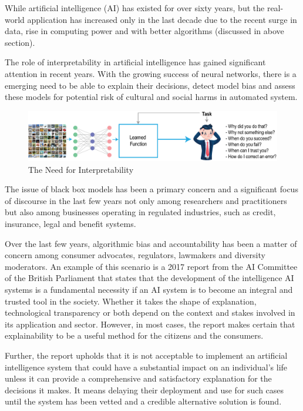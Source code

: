 While artificial intelligence (AI) has existed for over sixty years, but the real-world application has increased only in the last decade due to the recent surge in data, rise in computing power and with better algorithms (discussed in above section).

The role of interpretability in artificial intelligence has gained significant attention in recent years. With the growing success of neural networks, there is a emerging need to be able to explain their decisions, detect model bias and assess these models for potential risk of cultural and social harms in automated system.

\begin{figure}[htbp]
\centering
\includegraphics[width=1\textwidth]{images/xa-concept-part-1.eps}
\caption{The Need for Interpretability}
\label{fig:Why Interpretability Matters}
\end{figure}

The issue of black box models has been a primary concern and a significant focus of discourse in the last few years not only among researchers and practitioners \cite{Samek} but also among businesses operating in regulated industries, such as credit, insurance, legal and benefit systems. 

Over the last few years, algorithmic bias and accountability has been a matter of concern among consumer advocates, regulators, lawmakers and diversity moderators. An example of this scenario is a 2017 report from the AI Committee of the British Parliament \cite{Hagras2018} that states that the development of the intelligence AI systems is a fundamental necessity if an AI system is to become an integral and trusted tool in the society. Whether it takes the shape of explanation, technological transparency or both depend on the context and stakes involved in its application and sector. However, in most cases, the report makes certain that explainability to be a useful method for the citizens and the consumers. 

Further, the report upholds that it is not acceptable to implement an artificial intelligence system that could have a substantial impact on an individual's life unless it can provide a comprehensive and satisfactory explanation for the decisions it makes. It means delaying their deployment and use for such cases until the system has been vetted and a credible alternative solution is found.


